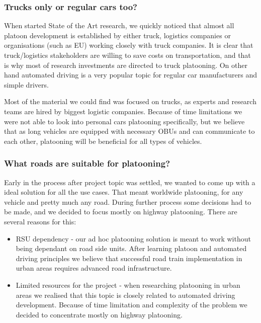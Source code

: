 \subsubsection{Trucks only or regular cars too?}
When started State of the Art research, we quickly noticed that almost all platoon development is established by either truck, logistics companies or organisations (such as EU) working closely with truck companies. It is clear that truck/logistics stakeholders are willing to save costs on transportation, and that is why most of research investments are directed to truck platooning. On other hand automated driving is a very popular topic for regular car manufacturers and simple drivers.\par
Most of the material we could find was focused on trucks, as experts and research teams are hired by biggest logistic companies. Because of time limitations we were not able to look into personal cars platooning specifically, but we believe that as long vehicles are equipped with necessary OBUs and can communicate to each other, platooning will be beneficial for all types of vehicles.\par
%
\subsubsection{What roads are suitable for platooning?}
Early in the process after project topic was settled, we wanted to come up with a ideal solution for all the use cases. That meant worldwide platooning, for any vehicle and pretty much any road. During further process some decisions had to be made, and we decided to focus mostly on highway platooning. There are several reasons for this:
\begin{itemize}
    \item RSU dependency - our ad hoc platooning solution is meant to work without being dependant on road side units. After learning platoon and automated driving principles we believe that successful road train implementation in urban areas requires advanced road infrastructure.
    \item Limited resources for the project - when researching platooning in urban areas we realised that this topic is closely related to automated driving development. Because of time limitation and complexity of the problem we decided to concentrate mostly on highway platooning.
\end{itemize}
%
